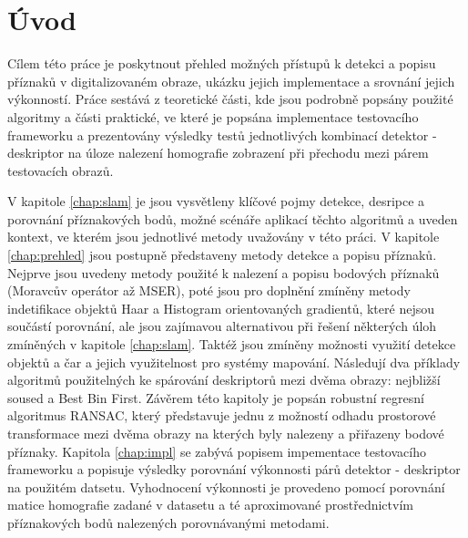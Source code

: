 

\chapter{Úvod}

Cílem této práce je poskytnout přehled možných přístupů k detekci a popisu příznaků v digitalizovaném obraze, ukázku jejich implementace a srovnání jejich výkonností. Práce sestává z teoretické části, kde jsou podrobně popsány použité algoritmy a části praktické, ve které je popsána implementace testovacího frameworku a prezentovány výsledky testů jednotlivých kombinací detektor - deskriptor na úloze nalezení homografie zobrazení při přechodu mezi párem testovacích obrazů.

V kapitole \ref{chap:slam} je jsou vysvětleny klíčové pojmy detekce, desripce a porovnání příznakových bodů, možné scénáře aplikací těchto algoritmů a uveden kontext, ve kterém jsou jednotlivé metody uvažovány v této práci. V kapitole \ref{chap:prehled} jsou postupně představeny metody detekce a popisu příznaků. Nejprve jsou uvedeny metody použité k nalezení a popisu bodových příznaků (Moravcův operátor až MSER), poté jsou pro doplnění zmíněny metody indetifikace objektů Haar a Histogram orientovaných gradientů, které nejsou součástí porovnání, ale jsou zajímavou alternativou při řešení některých úloh zmíněných v kapitole \ref{chap:slam}. Taktéž jsou zmíněny možnosti využití detekce objektů a čar a jejich využitelnost pro systémy mapování. Následují dva příklady algoritmů použitelných ke spárování deskriptorů mezi dvěma obrazy: nejbližší soused a Best Bin First. Závěrem této kapitoly je popsán robustní regresní algoritmus RANSAC, který představuje jednu z možností odhadu prostorové transformace mezi dvěma obrazy na kterých byly nalezeny a přiřazeny bodové příznaky. Kapitola \ref{chap:impl} se zabývá popisem impementace testovacího frameworku a popisuje výsledky porovnání výkonnosti párů detektor - deskriptor na použitém datsetu. Vyhodnocení výkonnosti je provedeno pomocí porovnání matice homografie zadané v datasetu a té aproximované prostřednictvím příznakových bodů nalezených porovnávanými metodami.

